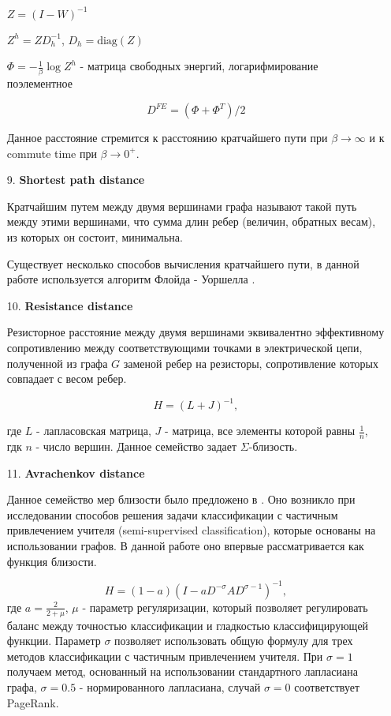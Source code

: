 \begin{itemize}
$Z = (I-W)^{-1}$

$Z^h = ZD_h^{-1}$, $D_h = \text{diag}(Z)$

$\Phi = -\frac{1}{\beta} \log Z^h$ - матрица свободных энергий, логарифмирование поэлементное

\begin{equation}
D^{FE} = (\Phi + \Phi ^T)/ 2
\end{equation}

Данное расстояние стремится к расстоянию кратчайшего пути при $\beta \rightarrow \infty$ и к commute time при $\beta \rightarrow 0^+$.

\item[9.] \textbf{Shortest path distance}

Кратчайшим путем между двумя вершинами графа называют такой путь между этими вершинами, что сумма длин ребер (величин, обратных весам), из которых он состоит, минимальна.

Существует несколько способов вычисления кратчайшего пути, в данной работе используется алгоритм Флойда - Уоршелла \cite{floyd1962algorithm}.

\item[10.] \textbf{Resistance distance}

Резисторное расстояние между двумя вершинами эквивалентно эффективному сопротивлению между соответствующими точками в электрической цепи, полученной из графа $G$ заменой ребер на резисторы, сопротивление которых совпадает с весом ребер. 

\begin{equation}
H = (L + J)^{-1},
\end{equation}
 
где $L$ - лапласовская матрица, $J$ - матрица, все элементы которой равны $\frac {1}{n}$, гдк $n$ - число вершин. Данное семейство задает $\Sigma$-близость.

\item[11.] \textbf{Avrachenkov distance}

Данное семейство мер близости было предложено в \cite{avrachenkov2012generalized}. Оно возникло при исследовании способов решения задачи классификации с частичным привлечением учителя (semi-supervised classification), которые основаны на использовании графов. В данной работе оно впервые рассматривается как функция близости.

\begin{equation}
H = (1 - a)(I - aD^{-\sigma}AD^{\sigma-1})^{-1},
\end{equation}
где $a = \frac {2}{2+\mu}$,  $\mu$ - параметр регуляризации, который позволяет регулировать баланс между точностью классификации и гладкостью классифицирующей функции. Параметр 
$\sigma$ позволяет использовать общую формулу для трех методов классификации с частичным привлечением учителя. При $\sigma = 1$ получаем метод, основанный на использовании стандартного лапласиана графа, $\sigma = 0.5$ - нормированного лапласиана,  случай $\sigma = 0$ соответствует PageRank.


\end{itemize}

